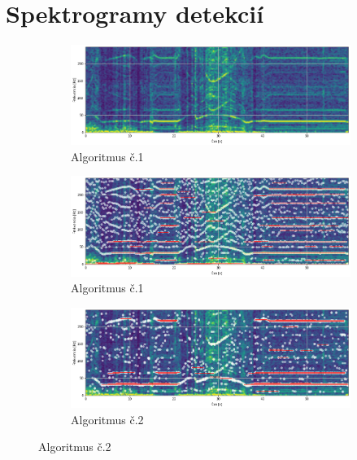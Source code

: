  \thispagestyle{empty}
\setcounter{figure}{0}
\chapter{Spektrogramy detekcií}
\renewcommand*{\thepage}{D-\arabic{page}}
\begin{figure}[h]
	\centering
	\begin{subfigure}{\textwidth}
        \centering
     	\includegraphics[width=\textwidth]{figures/verification/L35-dataset-spectrum.png}
     	\caption{Algoritmus č.1}
     \end{subfigure}
     \begin{subfigure}{\textwidth}
        \centering
     	\includegraphics[width=\textwidth]{figures/verification/L35-dataset-A1.png}
     	\caption{Algoritmus č.1}
     \end{subfigure}
     \begin{subfigure}{\textwidth}
    	\centering
        \includegraphics[width=\textwidth]{figures/verification/L35-dataset-A2.png}
        \caption{Algoritmus č.2}
     \end{subfigure}

\end{figure}

